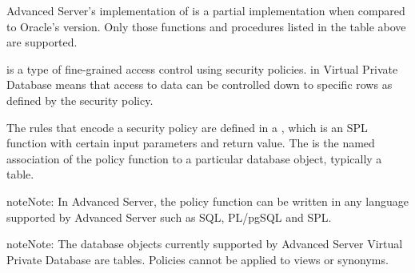 \documentclass[letterpaper,10pt,english,openany,oneside]{sphinxmanual}
\begin{document}
Advanced Server’s implementation of  is a partial
implementation when compared to Oracle’s version. Only those functions
and procedures listed in the table above are supported.

 is a type of fine-grained access control
using security policies.  in Virtual
Private Database means that access to data can be controlled down to
specific rows as defined by the security policy.

The rules that encode a security policy are defined in a , which is an SPL function with certain input parameters and
return value. The  is the named association of the
policy function to a particular database object, typically a table.

\begin{sphinxadmonition}{note}{Note:}
In Advanced Server, the policy function can be written in any language supported by Advanced Server such as SQL, PL/pgSQL and SPL.
\end{sphinxadmonition}

\begin{sphinxadmonition}{note}{Note:}
The database objects currently supported by Advanced Server Virtual Private Database are tables. Policies cannot be applied to views or synonyms.
\end{sphinxadmonition}
\end{document}
